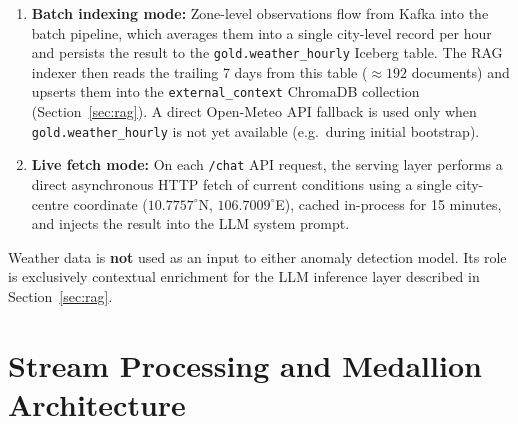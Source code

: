   \begin{enumerate}
      \item \textbf{Batch indexing mode:} Zone-level observations flow
      from Kafka into the batch pipeline, which averages them into a
      single city-level record per hour and persists the result to the
      \texttt{gold.weather\_hourly} Iceberg table. The RAG indexer
      then reads the trailing 7 days from this table
      ($\approx 192$ documents) and upserts them into the
      \texttt{external\_\allowbreak context} ChromaDB collection
      (Section~\ref{sec:rag}). A direct Open-Meteo API fallback is
      used only when \texttt{gold.weather\_hourly} is not yet
      available (e.g.\ during initial bootstrap).

      \item \textbf{Live fetch mode:} On each \texttt{/chat} API request,
      the serving layer performs a direct asynchronous HTTP fetch of
      current conditions using a single city-centre coordinate
      ($10.7757^\circ$N, $106.7009^\circ$E), cached in-process for
      15 minutes, and injects the result into the LLM system prompt.
  \end{enumerate}                                                                                                                                         
                                                                                                                                                          
  Weather data is \textbf{not} used as an input to either anomaly detection                                                                               
  model. Its role is exclusively contextual enrichment for the LLM
  inference layer described in Section~\ref{sec:rag}.                                                                                                     
                                                                                                                                                          
  \section{Stream Processing and Medallion Architecture}                                                                                                  
  \label{sec:medallion}

